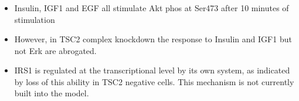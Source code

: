\documentclass{beamer}
\begin{document}
\begin{frame}
    \frametitle{ \cite{Harrington2004}}
    \begin{itemize}
        \item Insulin, IGF1 and EGF all stimulate Akt phos at Ser473 after 10 minutes of stimulation
        \item However, in TSC2 complex knockdown the response to Insulin and IGF1 but not Erk are abrogated.
        \item IRS1 is regulated at the transcriptional level by its own system, as indicated by loss of this ability in TSC2 negative cells. This mechanism is not currently built into the model.
    \end{itemize}
\end{frame}

%
%
%
\end{document}
